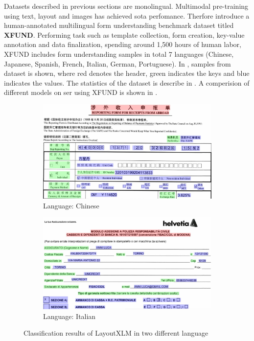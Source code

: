Datasets described in previous sections are monolingual. Multimodal pre-training using text, layout and images has achieved \acrshort{sota} perfomance. Therfore \cite{xfund} introduce a human-annotated multilingual form understanding benchmark dataset titled \textbf{XFUND}. Performing task such as template collection, form creation, key-value annotation and data finalization, spending around 1,500 hours of human labor, XFUND includes form understanding samples in total 7 languages (Chinese, Japanese, Spanish, French, Italian, German, Portuguese). In , samples from dataset is shown, where red denotes the header, green indicates the keys and blue indicates the values. The statistics of the dataset is describe in . A comperision of different models on \acrshort{ser} using XFUND is shown in .  

\begin{figure}[!ht]
    \begin{subfigure}{\textwidth}
    \centering
    \includegraphics[scale=0.3]{chapters/images/Literature_review/LayoutXLM_Results_Chinese.JPG}
    \caption{Language: Chinese}
    \label{subfig_xfund:a}
    \end{subfigure}
    \begin{subfigure}{\textwidth}
    \centering
    \includegraphics[scale=0.3]{chapters/images/Literature_review/LayoutXLM_Results_Italian.JPG}
    \caption{Language: Italian}
    \label{subfig_xfund:b}
    \end{subfigure}
    \caption{Classification results of LayoutXLM in two different language \cite{xu2021layoutxlm}}\label{fig:XFUND}
\end{figure}

